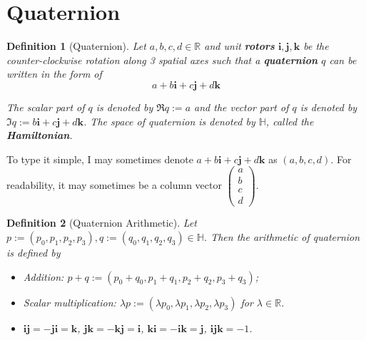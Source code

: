 \documentclass[12pt]{article}
\newtheorem*{definition}{Definition}
\begin{document}
    \section{Quaternion}

    \begin{definition}[Quaternion]
        Let $a,b,c,d\in\mathbb{R}$ and unit \textbf{rotors} $\mathbf{i},\mathbf{j},\mathbf{k}$ be the counter-clockwise rotation along 3 spatial axes such that a \textbf{quaternion} $q$ can be written in the form of $$a+b\mathbf{i}+c\mathbf{j}+d\mathbf{k}$$

        The scalar part of $q$ is denoted by $\Re{q}:=a$ and the vector part of $q$ is denoted by $\Im{q}:=b\mathbf{i}+c\mathbf{j}+d\mathbf{k}$. The space of quaternion is denoted by $\mathbb{H}$, called the \textbf{Hamiltonian}.
    \end{definition}

    To type it simple, I may sometimes denote $a+b\mathbf{i}+c\mathbf{j}+d\mathbf{k}$ as $(a,b,c,d)$. For readability, it may sometimes be a column vector $\begin{pmatrix}
        a\\b\\c\\d
    \end{pmatrix}$.

    \begin{definition}[Quaternion Arithmetic]
        Let $p:=(p_0,p_1,p_2,p_3),q:=(q_0,q_1,q_2,q_3)\in\mathbb{H}$. Then the arithmetic of quaternion is defined by\begin{itemize}
            \item Addition: $p+q:=(p_0+q_0,p_1+q_1,p_2+q_2,p_3+q_3)$;
            \item Scalar multiplication: $\lambda p:=(\lambda p_0,\lambda p_1, \lambda p_2, \lambda p_3)$ for $\lambda\in\mathbb{R}$.
            \item $\mathbf{i}\mathbf{j}=-\mathbf{j}\mathbf{i}=\mathbf{k}$, $\mathbf{j}\mathbf{k}=-\mathbf{k}\mathbf{j}=\mathbf{i}$, $\mathbf{k}\mathbf{i}=-\mathbf{i}\mathbf{k}=\mathbf{j}$, $\mathbf{i}\mathbf{j}\mathbf{k}=-1$.
        \end{itemize}
    \end{definition}
\end{document}
